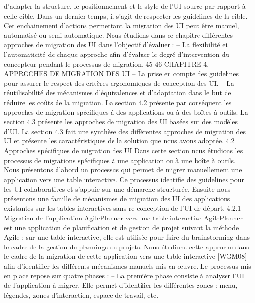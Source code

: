 \documentclass{article}
\begin{document}
d’adapter la structure, le positionnement et le style de l’UI source par rapport \`{a} celle cible. Dans un
dernier temps, il s’agit de respecter les guidelines de la cible. Cet enchainement d’actions permettant
la migration des UI peut \^{e}tre manuel, automatis\'{e} ou semi automatique.
Nous \'{e}tudions dans ce chapitre diff\'{e}rentes approches de migration des UI dans l’objectif d’\'{e}valuer :
– La ﬂexibilit\'{e} et l’automaticit\'{e} de chaque approche aﬁn d’\'{e}valuer le degr\'{e} d’intervention du
concepteur pendant le processus de migration.
45
46
CHAPITRE 4. APPROCHES DE MIGRATION DES UI
– La prise en compte des guidelines pour assurer le respect des crit\`{e}res ergonomiques de conception des UI.
– La r\'{e}utilisabilit\'{e} des m\'{e}canismes d’\'{e}quivalences et d’adaptation dans le but de r\'{e}duire les
co\^{u}ts de la migration.
La section 4.2 pr\'{e}sente par cons\'{e}quent les approches de migration sp\'{e}ciﬁques \`{a} des applications
ou \`{a} des bo\^{i}tes \`{a} outils. La section 4.3 pr\'{e}sente les approches de migration des UI bas\'{e}es sur des mod\`{e}les d’UI. La section 4.3 fait une synth\`{e}se des diff\'{e}rentes approches de migration des UI et pr\'{e}sente
les caract\'{e}ristiques de la solution que nous avons adopt\'{e}e.
4.2
Approches sp\'{e}ciﬁques de migration des UI
Dans cette section nous \'{e}tudions les processus de migrations sp\'{e}ciﬁques \`{a} une application ou \`{a}
une bo\^{i}te \`{a} outils. Nous pr\'{e}sentons d’abord un processus qui permet de migrer manuellement une
application vers une table interactive. Ce processus identiﬁe des guidelines pour les UI collaboratives
et s’appuie sur une d\'{e}marche structur\'{e}e. Ensuite nous pr\'{e}sentons une famille de m\'{e}canismes de migration des UI des applications existantes sur les tables interactives sans re-conception de l’UI de
d\'{e}part.
4.2.1
Migration de l’application AgilePlanner vers une table interactive
AgilePlanner est une application de planiﬁcation et de gestion de projet suivant la m\'{e}thode Agile ;
sur une table interactive, elle est utilis\'{e}e pour faire du brainstorming dans le cadre de la gestion de
plannings de projets. Nous \'{e}tudions cette approche dans le cadre de la migration de cette application
vers une table interactive [WGM08] aﬁn d’identiﬁer les diff\'{e}rents m\'{e}canismes manuels mis en œuvre.
Le processus mis en place repose sur quatre phases :
– La premi\`{e}re phase consiste \`{a} analyser l’UI de l’application \`{a} migrer. Elle permet d’identiﬁer
les diff\'{e}rentes zones : menu, l\'{e}gendes, zones d’interaction, espace de travail, etc.
\end{document}
